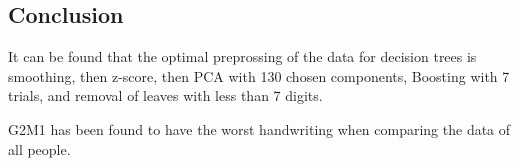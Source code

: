 \subsection{Conclusion}
It can be found that the optimal preprossing of the data for decision trees is
smoothing, then
z-score, then
PCA with 130 chosen components,
Boosting with 7 trials, and removal of leaves with less than 7 digits.

G2M1
has been found to have the worst handwriting when comparing the data of all people.

